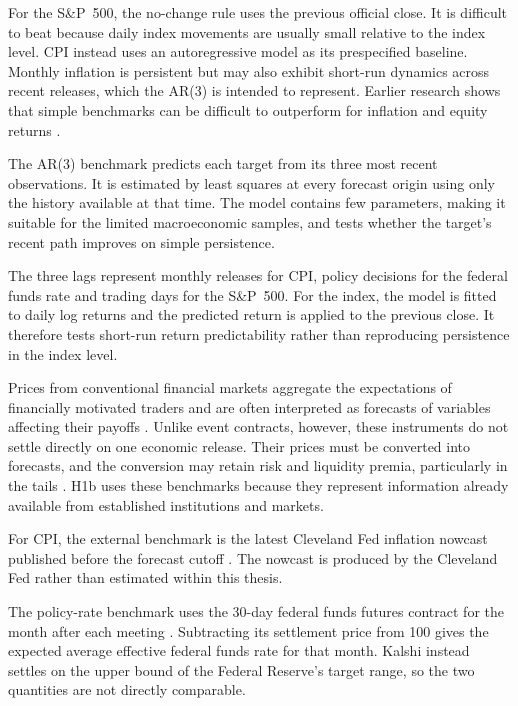 \documentclass[12pt,a4paper]{report}
\begin{document}
For the S\&P~500, the no-change rule uses the previous official close. It is
difficult to beat because daily index movements are usually small relative to
the index level. CPI instead uses an autoregressive model as its prespecified
baseline. Monthly inflation is persistent but may also exhibit short-run
dynamics across recent releases, which the AR(3) is intended to represent.
Earlier research shows that simple benchmarks can be difficult to outperform
for inflation and equity returns \parencite{atkeson2001,welch2008}.

The AR(3) benchmark predicts each target from its three most recent
observations. It is estimated by least squares at every forecast origin using
only the history available at that time. The model contains few parameters,
making it suitable for the limited macroeconomic samples, and tests whether the
target's recent path improves on simple persistence.

The three lags represent monthly releases for CPI, policy decisions for the
federal funds rate and trading days for the S\&P~500. For the index, the model
is fitted to daily log returns and the predicted return is applied to the
previous close. It therefore tests short-run return predictability rather than
reproducing persistence in the index level.

Prices from conventional financial markets aggregate the expectations of
financially motivated traders and are often interpreted as forecasts of
variables affecting their payoffs \parencite{fama1970,gurkaynak2006}. Unlike
event contracts, however, these instruments do not settle directly on one
economic release. Their prices must be converted into forecasts, and the
conversion may retain risk and liquidity premia, particularly in the tails
\parencite{kitsul2013}. H1b uses these benchmarks because they represent
information already available from established institutions and markets.

For CPI, the external benchmark is the latest Cleveland Fed inflation nowcast
published before the forecast cutoff \parencite{knotek2017}. The nowcast is
produced by the Cleveland Fed rather than estimated within this thesis.

The policy-rate benchmark uses the 30-day federal funds futures contract for
the month after each meeting \parencite{gurkaynak2007}. Subtracting its
settlement price from 100 gives the expected average effective federal funds
rate for that month. Kalshi instead settles on the upper bound of the Federal
Reserve's target range, so the two quantities are not directly comparable.
\end{document}

